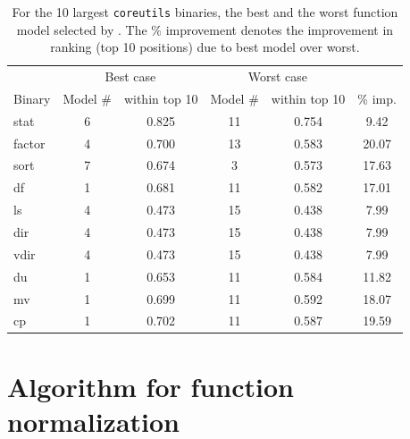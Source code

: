 \begin{appendices}
\begin{table}[!ht]
\begin{center}
\caption{For the 10 largest \texttt{coreutils} binaries, the best and the worst function model selected by \tool. The \% improvement denotes the improvement in ranking (top 10 positions) due to best model over worst.}
		\label{tab:func_mod}
		\scriptsize
\begin{tabular}{ | l | c | c || c| c | c | }
\hline
	\ &  \multicolumn{2}{c||}{Best case} & \multicolumn{2}{c|}{Worst case}& \ \\
	Binary & Model \# & within top 10 &  Model \# & within top 10  & \% imp.  \\ \hline
	stat & 6 & 0.825 & 11 & 0.754 & 9.42 \\ \hline
	factor & 4 & 0.700 & 13 & 0.583 & 20.07 \\ \hline
	sort & 7 & 0.674 & 3 & 0.573 & 17.63 \\ \hline
	df & 1 & 0.681 & 11 & 0.582 & 17.01 \\ \hline
	ls & 4 & 0.473 & 15  & 0.438 & 7.99 \\ \hline
	dir & 4 & 0.473 & 15 & 0.438 & 7.99 \\ \hline
	vdir & 4 & 0.473 & 15 & 0.438 & 7.99 \\ \hline
	du & 1 & 0.653 & 11 & 0.584 & 11.82 \\ \hline
	mv & 1 & 0.699 & 11 & 0.592 & 18.07 \\ \hline
	cp & 1 & 0.702 & 11 & 0.587 & 19.59 \\ \hline
\end{tabular}
\end{center}
\end{table}

\vfill\eject

\section{Algorithm for function normalization} \label{app:norm_algo}


\end{appendices}
